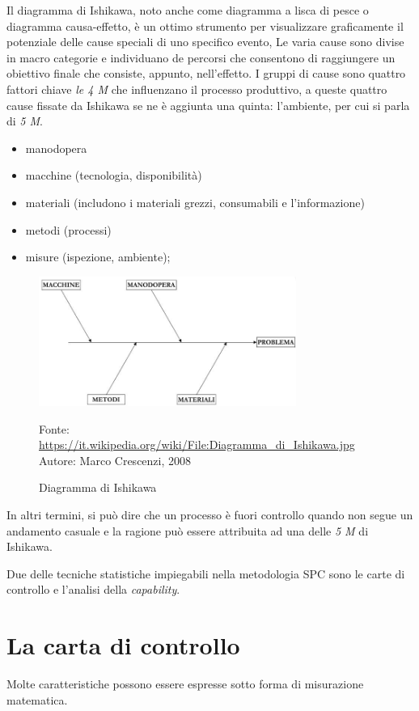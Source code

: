 Il diagramma di Ishikawa, noto anche come diagramma a lisca di pesce o diagramma causa-effetto, è un ottimo strumento per visualizzare graficamente il potenziale delle cause speciali di uno specifico evento,
Le varia cause sono divise in macro categorie e individuano de percorsi che consentono di raggiungere un obiettivo finale che consiste, appunto, nell'effetto.
I gruppi di cause sono quattro fattori chiave \textit{le 4 M} che influenzano il processo produttivo,
a queste quattro cause fissate da Ishikawa se ne è aggiunta una quinta: l'ambiente, per cui si parla di \textit{5 M}.
\cite{ishi:book}

\begin{itemize}
  \item manodopera
  \item macchine (tecnologia, disponibilità)
  \item materiali (includono i materiali grezzi, consumabili e l'informazione)
  \item metodi (processi)
  \item misure (ispezione, ambiente);
  \end{itemize}


\begin{figure}[h]
  \centering
  \includegraphics[width=0.75\textwidth]{img/ishikawa.png}
  \caption{Diagramma di Ishikawa} 
  {Fonte: \url{https://it.wikipedia.org/wiki/File:Diagramma_di_Ishikawa.jpg} 
  Autore: Marco Crescenzi, 2008} 
  \label{fig:ishikawa.png}
\end{figure}


In altri termini, si può dire che un processo è fuori controllo quando non segue un andamento casuale e la ragione può essere attribuita ad una delle \textit{5 M} di Ishikawa.

Due delle tecniche statistiche impiegabili nella metodologia SPC sono le carte di controllo e l'analisi della \textit{capability}.
\cite{HumanWare}

\section{La carta di controllo}
Molte caratteristiche possono essere espresse sotto forma di misurazione matematica. 

